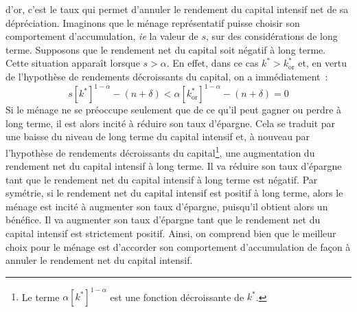 \documentclass[10pt,a4paper,notitlepage,onecolumn]{article}
\begin{document}
d'or, c'est le taux qui permet d'annuler le rendement du capital
intensif net de sa dépréciation. Imaginons que le ménage
représentatif puisse choisir son comportement d'accumulation,
\textit{ie} la valeur de $s$, sur des considérations de long terme.
Supposons que le rendement net du capital soit négatif à long terme.
Cette situation apparaît lorsque $s>\alpha$. En effet, dans ce cas
$k^{\ast}>k^{\ast}_{\mathrm{or}}$ et, en vertu de l'hypothèse de
rendements décroissants du capital, on a immédiatement~:
\[
s \left[k^{\ast}\right]^{1-\alpha} - (n+\delta)<\alpha
\left[k^{\ast}_{\mathrm{or}}\right]^{1-\alpha} - (n+\delta) = 0
\]
Si le ménage ne se préoccupe seulement que de ce qu'il peut gagner
ou perdre à long terme, il est alors incité à réduire son taux
d'épargne. Cela se traduit par une baisse du niveau de long terme du
capital intensif et, à nouveau par l'hypothèse de rendements
décroissants du capital\footnote{Le terme $\alpha
\left[k^*\right]^{1-\alpha}$ est une fonction décroissante de
$k^*$.}, une augmentation du rendement net du capital intensif à
long terme. Il va réduire son taux d'épargne tant que le rendement
net du capital intensif à long terme est négatif. Par symétrie, si
le rendement net du capital intensif est positif à long terme, alors
le ménage est incité à augmenter son taux d'épargne, puisqu'il obtient alors 
un bénéfice. Il va augmenter son taux d'épargne tant que le
rendement net du capital intensif est strictement positif. Ainsi, on
comprend bien que le meilleur choix pour le ménage est d'accorder
son comportement d'accumulation de façon à annuler le rendement net
du capital intensif.\newline
\end{document}

